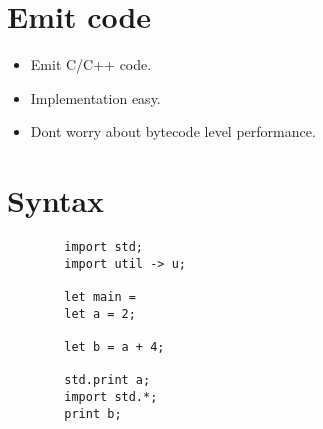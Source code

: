 \documentclass[11pt]{article}
\begin{document}
    \section{Emit code}
    \begin{itemize}
        \item Emit C/C++ code.
        \item Implementation easy.
        \item Dont worry about bytecode level performance.
    \end{itemize}

    \section{Syntax}
    \begin{verbatim}
        import std;
        import util -> u;

        let main =
        let a = 2;

        let b = a + 4;

        std.print a;
        import std.*;
        print b;
    \end{verbatim}
\end{document}
